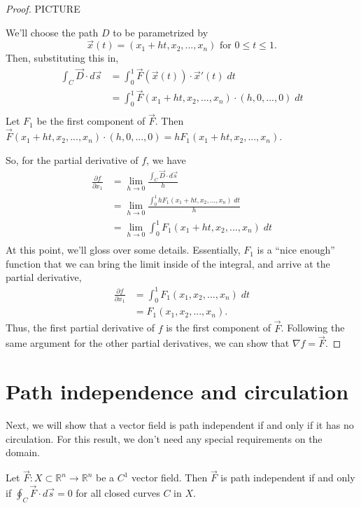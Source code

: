 \documentclass{ximera}
\begin{document}
\begin{proof}
PICTURE

We'll choose the path $D$ to be parametrized by
\[
\vec{x}(t) = (x_1 + ht,x_2,...,x_n)\text{ for }0\leq t\leq 1.
\]
Then, substituting this in, 
\begin{align*}
\int_C\vec{D}\cdot d\vec{s} &= \int_0^1 \vec{F}(\vec{x}(t))\cdot \vec{x}'(t)\;dt\\
&= \int_0^1 \vec{F}(x_1 + ht,x_2,...,x_n)\cdot (h,0,...,0)\;dt\\
\end{align*}
Let $F_1$ be the first component of $\vec{F}$. Then $\vec{F}(x_1 + ht,x_2,...,x_n)\cdot (h,0,...,0) = hF_1(x_1 + ht,x_2,...,x_n)$. 

So, for the partial derivative of $f$, we have 
\begin{align*}
\frac{\partial f}{\partial x_1} &= \lim_{h\rightarrow 0} \frac{\int_C\vec{D}\cdot d\vec{s}}{h}\\
&= \lim_{h\rightarrow 0} \frac{\int_0^1 hF_1(x_1 + ht,x_2,...,x_n)\;dt}{h}\\
&= \lim_{h\rightarrow 0} \int_0^1 F_1(x_1 + ht,x_2,...,x_n)\;dt\\
\end{align*}
At this point, we'll gloss over some details. Essentially, $F_1$ is a ``nice enough'' function that we can bring the limit inside of the integral, and arrive at the partial derivative,
\begin{align*}
\frac{\partial f}{\partial x_1} &= \int_0^1 F_1(x_1,x_2,...,x_n)\;dt\\
&= F_1(x_1,x_2,...,x_n).
\end{align*}
Thus, the first partial derivative of $f$ is the first component of $\vec{F}$. Following the same argument for the other partial derivatives, we can show that $\nabla f = \vec{F}$.
\end{proof}

\section*{Path independence and circulation}

Next, we will show that a vector field is path independent if and only if it has no circulation. For this result, we don't need any special requirements on the domain.

\begin{proposition}
Let $\vec{F}:X\subset\mathbb{R}^n\rightarrow \mathbb{R}^n$ be a $C^1$ vector field. Then $\vec{F}$ is path independent if and only if $\oint_C\vec{F}\cdot d\vec{s}=0$ for all closed curves $C$ in $X$.
\end{proposition}
\end{document}
